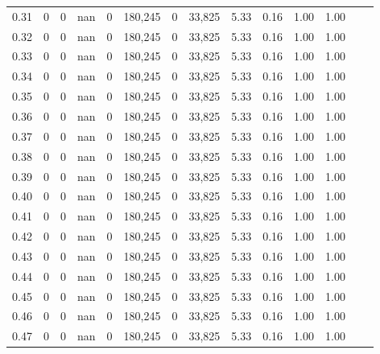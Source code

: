 \begin{tabular}{rrrrrrrrrrrrrr}
0.31 &        0 &       0 &     nan &        0 &  180,245 &       0 &  33,825 &  5.33 &  0.16 &  1.00 &      1.00 \\
0.32 &        0 &       0 &     nan &        0 &  180,245 &       0 &  33,825 &  5.33 &  0.16 &  1.00 &      1.00 \\
0.33 &        0 &       0 &     nan &        0 &  180,245 &       0 &  33,825 &  5.33 &  0.16 &  1.00 &      1.00 \\
0.34 &        0 &       0 &     nan &        0 &  180,245 &       0 &  33,825 &  5.33 &  0.16 &  1.00 &      1.00 \\
0.35 &        0 &       0 &     nan &        0 &  180,245 &       0 &  33,825 &  5.33 &  0.16 &  1.00 &      1.00 \\
0.36 &        0 &       0 &     nan &        0 &  180,245 &       0 &  33,825 &  5.33 &  0.16 &  1.00 &      1.00 \\
0.37 &        0 &       0 &     nan &        0 &  180,245 &       0 &  33,825 &  5.33 &  0.16 &  1.00 &      1.00 \\
0.38 &        0 &       0 &     nan &        0 &  180,245 &       0 &  33,825 &  5.33 &  0.16 &  1.00 &      1.00 \\
0.39 &        0 &       0 &     nan &        0 &  180,245 &       0 &  33,825 &  5.33 &  0.16 &  1.00 &      1.00 \\
0.40 &        0 &       0 &     nan &        0 &  180,245 &       0 &  33,825 &  5.33 &  0.16 &  1.00 &      1.00 \\
0.41 &        0 &       0 &     nan &        0 &  180,245 &       0 &  33,825 &  5.33 &  0.16 &  1.00 &      1.00 \\
0.42 &        0 &       0 &     nan &        0 &  180,245 &       0 &  33,825 &  5.33 &  0.16 &  1.00 &      1.00 \\
0.43 &        0 &       0 &     nan &        0 &  180,245 &       0 &  33,825 &  5.33 &  0.16 &  1.00 &      1.00 \\
0.44 &        0 &       0 &     nan &        0 &  180,245 &       0 &  33,825 &  5.33 &  0.16 &  1.00 &      1.00 \\
0.45 &        0 &       0 &     nan &        0 &  180,245 &       0 &  33,825 &  5.33 &  0.16 &  1.00 &      1.00 \\
0.46 &        0 &       0 &     nan &        0 &  180,245 &       0 &  33,825 &  5.33 &  0.16 &  1.00 &      1.00 \\
0.47 &        0 &       0 &     nan &        0 &  180,245 &       0 &  33,825 &  5.33 &  0.16 &  1.00 &      1.00 \\

\end{tabular}
